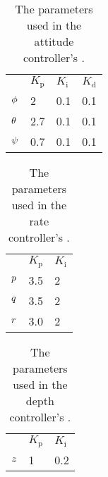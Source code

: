 \begin{table}[tbp]
  \centering
  \caption{\label{tab:parametersAttitude}%
    The parameters used in the attitude controller's \abbrPID.}
  \begin{tabular}{l l l l}
    \toprule%
       & \textbf{$K_\text{p}$} & \textbf{$K_\text{i}$}& \textbf{$K_\text{d}$}\\
    \otoprule%
    $\phi$  & 2   & 0.1 & 0.1 \\
    $\theta$ & 2.7 & 0.1 & 0.1 \\
    $\psi$   & 0.7 & 0.1 & 0.1 \\
    \bottomrule%
  \end{tabular}
\end{table}

\begin{table}[tbp]
  \centering
  \caption{\label{tab:parametersRate}%
    The parameters used in the rate controller's \abbrPI.}
  \begin{tabular}{l l l}
    \toprule%
       & \textbf{$K_\text{p}$} & \textbf{$K_\text{i}$}\\
    \otoprule%
    $p$  & 3.5 & 2 \\
    $q$ & 3.5 & 2 \\
    $r$   & 3.0 & 2 \\
    \bottomrule%
  \end{tabular}
\end{table}

\begin{table}[tbp]
  \centering
  \caption{\label{tab:parametersDepth}%
    The parameters used in the depth controller's \abbrPI.}
  \begin{tabular}{l l l}
    \toprule%
       & \textbf{$K_\text{p}$} & \textbf{$K_\text{i}$}\\
    \otoprule%
    $z$  & 1 & 0.2 \\
    \bottomrule%
  \end{tabular}
\end{table}

